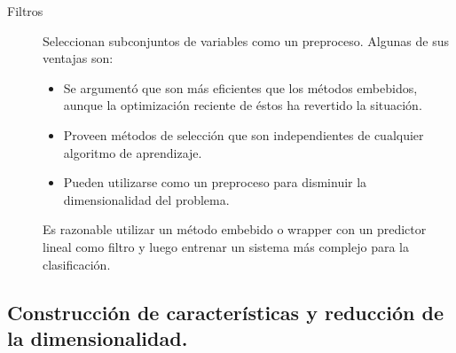 \documentclass[11pt,spanish]{article}
\begin{document}
\begin{description}
    \item[Filtros] Seleccionan subconjuntos de variables como un
    preproceso. Algunas de sus ventajas son:
    \begin{itemize}
        \item Se argumentó que son más eficientes que los
        métodos embebidos, aunque la optimización reciente de éstos ha revertido la situación.
        \item Proveen métodos de selección que son independientes de cualquier algoritmo de aprendizaje.
        \item Pueden utilizarse como un preproceso para disminuir la dimensionalidad del problema.
    \end{itemize}
    Es razonable utilizar un método embebido o wrapper con un predictor lineal como filtro y luego entrenar un sistema más complejo para la clasificación.

\end{description}

\subsection{Construcción de características y reducción de la dimensionalidad.}
\end{document}
